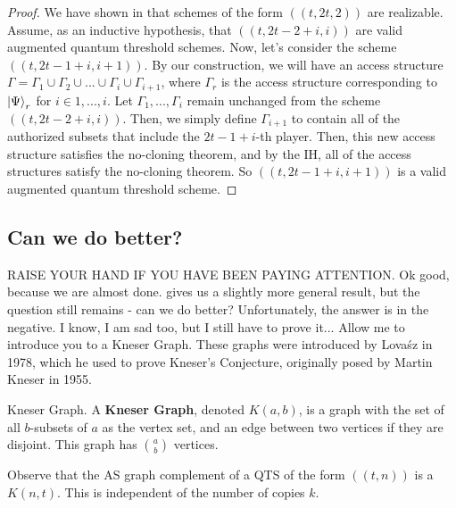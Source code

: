 \begin{proof}
    We have shown in  that schemes of the form $((t, 2t, 2))$ are realizable. Assume, as an inductive hypothesis, that $((t, 2t - 2 + i, i))$ are valid augmented quantum threshold schemes. Now, let's consider the scheme $((t, 2t-1+i, i+1))$. By our construction, we will have an access structure $\Gamma = \Gamma_1 \cup \Gamma_2 \cup ... \cup \Gamma_i \cup \Gamma_{i+1}$, where $\Gamma_r$ is the access structure corresponding to $\ket{\Psi}_r$ for $i \in {1,...,i}$. Let $\Gamma_1, ..., \Gamma_i$ remain unchanged from the scheme $((t, 2t - 2 + i, i))$. Then, we simply define $\Gamma_{i+1}$ to contain all of the authorized subsets that include the $2t-1+i$-th player. Then, this new access structure satisfies the no-cloning theorem, and by the IH, all of the access structures satisfy the no-cloning theorem. So $((t, 2t-1+i, i+1))$ is a valid augmented quantum threshold scheme.
\end{proof}

\subsection{Can we do better?}
\label{ssec:better}

RAISE YOUR HAND IF YOU HAVE BEEN PAYING ATTENTION. Ok good, because we are almost done.  gives us a slightly more general result, but the question still remains - can we do better? Unfortunately, the answer is in the negative. I know, I am sad too, but I still have to prove it... Allow me to introduce you to a Kneser Graph. These graphs were introduced by Lova\'{s}z in 1978, which he used to prove Kneser's Conjecture, originally posed by Martin Kneser in 1955.

\begin{definition}{Kneser Graph.}
    \label{defn:kneser-graph}
    A \textbf{Kneser Graph}, denoted $K(a,b)$, is a graph with the set of all $b$-subsets of $a$ as the vertex set, and an edge between two vertices if they are disjoint. This graph has $\binom{a}{b}$ vertices.  
\end{definition}

\begin{remark}
    Observe that the AS graph complement of a QTS of the form $((t,n))$ is a $K(n,t)$. This is independent of the number of copies $k$.
\end{remark}

